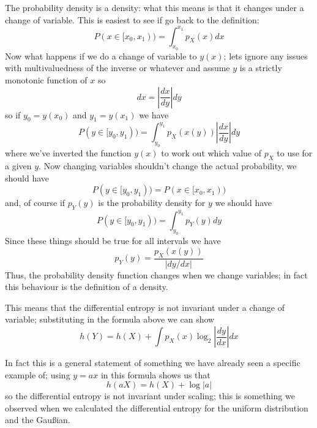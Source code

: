 \documentclass[12pt]{article}
\begin{document}
The probability density is a density: what this means is that it
changes under a change of variable. This is easiest to see if go back to the definition:
\begin{equation}
  P(x\in[x_0,x_1))=\int_{x_0}^{x_1}p_X(x)dx
\end{equation}
Now what happens if we do a change of variable to $y(x)$; lets ignore
any issues with multivaluedness of the inverse or whatever and assume
$y$ is a strictly monotonic function of $x$ so
\begin{equation}
  dx=\left|\frac{dx}{dy}\right|dy
\end{equation}
so if $y_0=y(x_0)$ and $y_1=y(x_1)$ we have
\begin{equation}
  P(y\in[y_0,y_1))=\int_{y_0}^{y_1} p_X(x(y))\left|\frac{dx}{dy}\right|dy
\end{equation}
where we've inverted the function $y(x)$ to work out which value of
$p_X$ to use for a given $y$. Now changing variables shouldn't change
the actual probability, we should have
\begin{equation}
  P(y\in[y_0,y_1))=  P(x\in[x_0,x_1))
\end{equation}
and, of course if $p_Y(y)$ is the probability density for $y$ we should have 
\begin{equation}
  P(y\in[y_0,y_1))=\int_{y_0}^{y_1} p_Y(y)dy
\end{equation}
Since these things should be true for all intervals we have
\begin{equation}
  p_Y(y)=\frac{p_X(x(y))}{|dy/dx|}
\end{equation}
Thus, the probability density function changes when we change
variables; in fact this behaviour is the definition of a density.

This means that the differential entropy is not invariant under a change of variable; substituting in the formula above we can show
\begin{equation}
  h(Y)=h(X)+\int p_X(x) \log_2\left|\frac{dy}{dx}\right|dx
\end{equation}

In fact this is a general statement of something we have already seen
a specific example of; using $y=a x$ in this formula shows us that
\begin{equation}
  h(aX)=h(X)+\log{|a|}
\end{equation}
so the differential entropy is not invariant under scaling; this is
something we observed when we calculated the differential entropy for
the uniform distribution and the Gau{\ss}ian.
\end{document}

